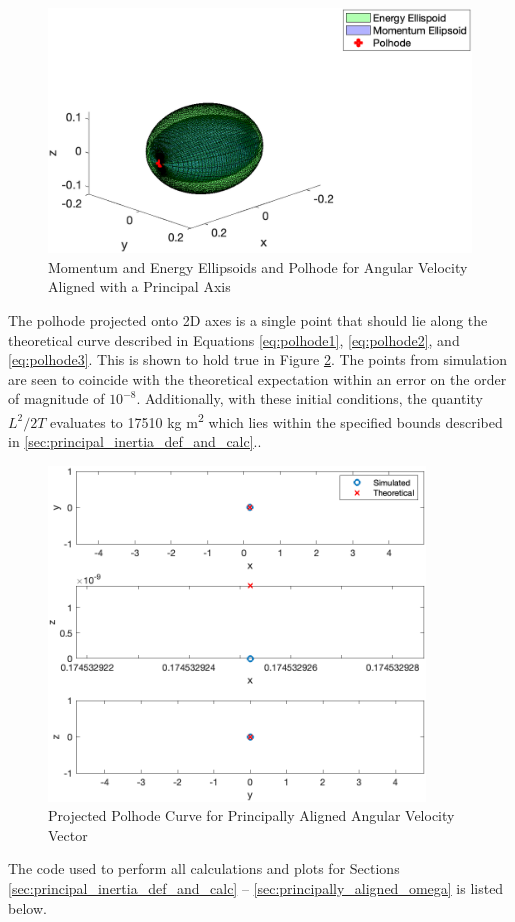 \begin{figure}[H]
    \centering
    \includegraphics[width = 12cm] {Images/ellipsoid_polhode_principal.png}
    \caption{Momentum and Energy Ellipsoids and Polhode for Angular Velocity Aligned with a Principal Axis}
    \label{fig:ellipsoid_super_plot_principal}
\end{figure}

The polhode projected onto 2D axes is a single point that should lie along the theoretical curve described in Equations \ref{eq:polhode1}, \ref{eq:polhode2}, and \ref{eq:polhode3}. This is shown to hold true in Figure \ref{fig:2d_polhode_principal}. The points from simulation are seen to coincide with the theoretical expectation within an error on the order of magnitude of $10^{-8}$. Additionally, with these initial conditions, the quantity $L^2/2T$ evaluates to 17510 kg m\textsuperscript{2} which lies within the specified bounds described in \ref{sec:principal_inertia_def_and_calc}..

\begin{figure}[H]
    \centering
    \includegraphics[width = 10cm]{Images/planar_polhode_principal.png}
    \caption{Projected Polhode Curve for Principally Aligned Angular Velocity Vector}
    \label{fig:2d_polhode_principal}
\end{figure}

The code used to perform all calculations and plots for Sections \ref{sec:principal_inertia_def_and_calc} -- \ref{sec:principally_aligned_omega} is listed below.

